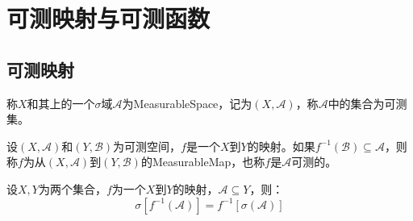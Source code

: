 \section{可测映射与可测函数}
\subsection{可测映射}
\begin{definition}
	称$X$和其上的一个$\sigma$域$\mathscr{A}$为\gls{MeasurableSpace}，记为$(X,\mathscr{A})$，称$\mathscr{A}$中的集合为可测集。
\end{definition}
\begin{definition}
	设$(X,\mathscr{A})$和$(Y,\mathscr{B})$为可测空间，$f$是一个$X$到$Y$的映射。如果$f^{-1}(\mathscr{B})\subseteq\mathscr{A}$，则称$f$为从$(X,\mathscr{A})$到$(Y,\mathscr{B})$的\gls{MeasurableMap}，也称$f$是$\mathscr{A}$可测的。
\end{definition}
\begin{lemma}\label{lem:PreimageSigmaField}
	设$X,Y$为两个集合，$f$为一个$X$到$Y$的映射，$\mathscr{A}\subseteq Y$，则：
	\begin{equation*}
		\sigma[f^{-1}(\mathscr{A})]=f^{-1}[\sigma(\mathscr{A})]
	\end{equation*}
\end{lemma}
